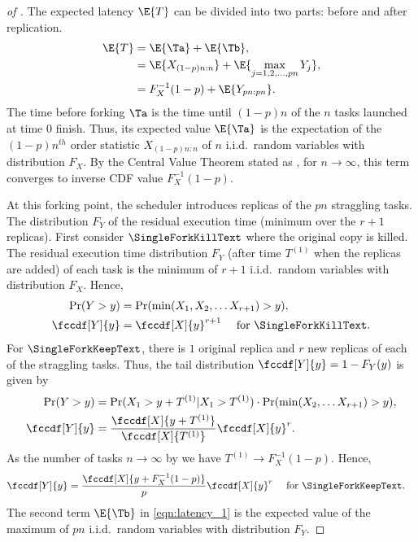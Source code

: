 \begin{proof}[of ]
The expected latency $\E{T}$ can be divided into two parts: before and after replication. \begin{align}
\E{T} &= \E{\Ta} + \E{\Tb}, \nonumber \\
&= \E{X_{(1-p)n:n} } + \E{ \max_{j=1, 2, \dots, pn} Y_j}, \nonumber \\
&= F_X^{-1}(1-p) + \E{Y_{pn:pn}}. \label{eqn:latency_1}
\end{align}
The time before forking $\Ta$ is the time until $(1-p)n$ of the $n$ tasks launched at time $0$ finish. Thus, its expected value $\E{\Ta}$ is the expectation of the $(1-p)n ^{th}$ order statistic $X_{(1-p)n:n}$ of $n$ i.i.d.\ random variables with distribution $F_X$. By the Central Value Theorem stated as , for $n \rightarrow \infty$, this term converges to inverse CDF value $F_X^{-1}(1-p)$.

At this forking point, the scheduler introduces replicas of the $pn$ straggling tasks. The distribution $F_Y$ of the residual execution time (minimum over the $r+1$ replicas). First consider $\SingleForkKillText$ where the original copy is killed. The residual execution
time distribution $F_Y$ (after time $T^{(1)}$ when the replicas are added) of each task is the minimum of $r+1$ i.i.d.\ random variables with distribution $F_X$. Hence,
\begin{align}
\Pr(Y>y) &= \Pr( \min (X_1, X_2, \dots X_{r+1} ) > y ) ,\\
\fccdf[Y]{y} &= \fccdf[X]{y}^{r+1} \quad \text{ for } \SingleForkKillText.
\end{align}
For $\SingleForkKeepText$, there is $1$ original replica and $r$ new replicas of each of the straggling tasks. Thus, the tail distribution $\fccdf[Y]{y} = 1- F_Y(y)$ is given by
\begin{align}
\Pr(Y>y) &= \Pr( X_1 > y + T^{(1)} \vert X_1 > T^{(1)}) \cdot \Pr( \min (X_2,\dots X_{r+1} ) > y ), \\
\fccdf[Y]{y} &= \frac{\fccdf[X]{y +T^{(1)} }}{ \fccdf[X]{T^{(1)}}} \fccdf[X]{y}^{r}.
\end{align}
As the number of tasks $n \rightarrow \infty$ by  we have $T^{(1)} \rightarrow F_X^{-1}(1-p)$. Hence,
\begin{align}
\fccdf[Y]{y} &= \frac{\fccdf[X]{y +F_X^{-1}(1-p) }}{p} \fccdf[X]{y}^{r} \quad \text{ for } \SingleForkKeepText.
\end{align}
The second term $\E{\Tb}$ in \eqref{eqn:latency_1} is the expected value of the maximum of $pn$ i.i.d.\ random variables with distribution $F_Y$.


\end{proof}

